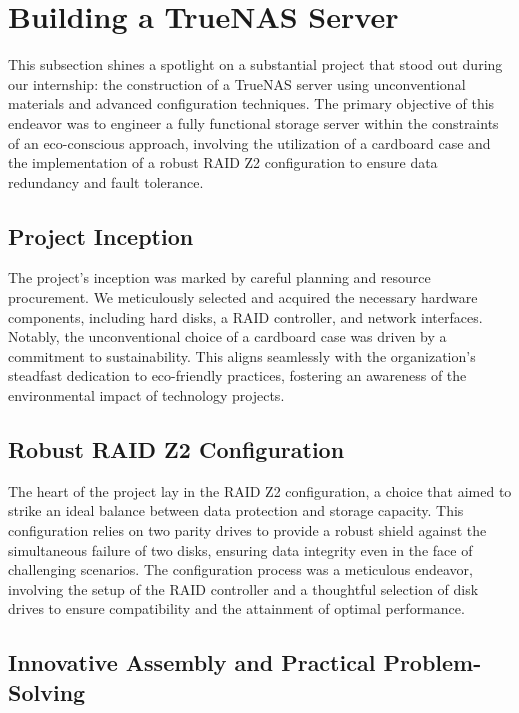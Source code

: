 \section{Building a TrueNAS Server}

This subsection shines a spotlight on a substantial project that stood out during our internship: the construction of a TrueNAS server using unconventional materials and advanced configuration techniques. The primary objective of this endeavor was to engineer a fully functional storage server within the constraints of an eco-conscious approach, involving the utilization of a cardboard case and the implementation of a robust RAID Z2 configuration to ensure data redundancy and fault tolerance.

\subsection{Project Inception}

The project's inception was marked by careful planning and resource procurement. We meticulously selected and acquired the necessary hardware components, including hard disks, a RAID controller, and network interfaces. Notably, the unconventional choice of a cardboard case was driven by a commitment to sustainability. This aligns seamlessly with the organization's steadfast dedication to eco-friendly practices, fostering an awareness of the environmental impact of technology projects.

\subsection{Robust RAID Z2 Configuration}

The heart of the project lay in the RAID Z2 configuration, a choice that aimed to strike an ideal balance between data protection and storage capacity\cite{yi2023optimizations}. This configuration relies on two parity drives to provide a robust shield against the simultaneous failure of two disks, ensuring data integrity even in the face of challenging scenarios. The configuration process was a meticulous endeavor, involving the setup of the RAID controller and a thoughtful selection of disk drives to ensure compatibility and the attainment of optimal performance.

\subsection{Innovative Assembly and Practical Problem-Solving}

